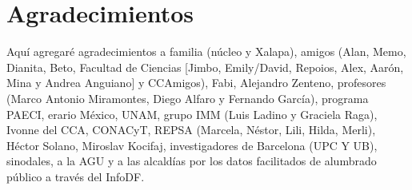 \chapter{Agradecimientos}


Aquí agregaré agradecimientos a familia (núcleo y Xalapa), amigos (Alan, Memo, Dianita, Beto, Facultad de Ciencias [Jimbo, Emily/David, Repoios, Alex, Aarón, Mina y Andrea Anguiano] y CCAmigos), Fabi, Alejandro Zenteno, profesores (Marco Antonio Miramontes, Diego Alfaro y Fernando García), programa PAECI, erario México, UNAM, grupo IMM (Luis Ladino y Graciela Raga), Ivonne del CCA, CONACyT, REPSA (Marcela, Néstor, Lili, Hilda, Merli), Héctor Solano, Miroslav Kocifaj, investigadores de Barcelona (UPC Y UB), sinodales, a la AGU y a las alcaldías por los datos facilitados de alumbrado público a través del InfoDF.







